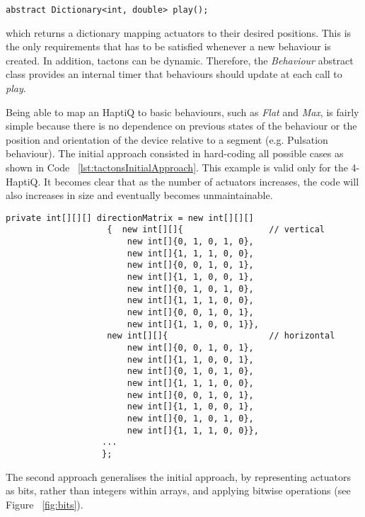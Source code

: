 \lstset{style=sharpc1}
\begin{lstlisting}
abstract Dictionary<int, double> play();
\end{lstlisting}

which returns a dictionary mapping actuators to their desired positions. 
This is the only requirements that has to be satisfied whenever a new behaviour is created. In addition, tactons can be dynamic. Therefore, the \textit{Behaviour} abstract class provides an internal timer that behaviours should update at each call to \textit{play}. 

Being able to map an HaptiQ to basic behaviours, such as \textit{Flat} and \textit{Max}, is fairly simple because there is no dependence on previous states of the behaviour or the position and orientation of the device relative to a segment (e.g. Pulsation behaviour). The initial approach consisted in hard-coding all possible cases as shown in Code ~\ref{lst:tactonsInitialApproach}. This example is valid only for the 4-HaptiQ. It becomes clear that as the number of actuators increases, the code will also increases in size and eventually becomes unmaintainable. 

\lstset{style=sharpc1}
\begin{lstlisting}[caption={Tactons - Initial approach},label={lst:tactonsInitialApproach}]
private int[][][] directionMatrix = new int[][][]
                    {  new int[][]{                 // vertical 
                        new int[]{0, 1, 0, 1, 0}, 
                        new int[]{1, 1, 1, 0, 0}, 
                        new int[]{0, 0, 1, 0, 1}, 
                        new int[]{1, 1, 0, 0, 1}, 
                        new int[]{0, 1, 0, 1, 0}, 
                        new int[]{1, 1, 1, 0, 0}, 
                        new int[]{0, 0, 1, 0, 1}, 
                        new int[]{1, 1, 0, 0, 1}}, 
                    new int[][]{                    // horizontal
                        new int[]{0, 0, 1, 0, 1},
                        new int[]{1, 1, 0, 0, 1},
                        new int[]{0, 1, 0, 1, 0},
                        new int[]{1, 1, 1, 0, 0},
                        new int[]{0, 0, 1, 0, 1},
                        new int[]{1, 1, 0, 0, 1},
                        new int[]{0, 1, 0, 1, 0},
                        new int[]{1, 1, 1, 0, 0}},
                   ...
                   };
\end{lstlisting}

The second approach generalises the initial approach, by representing actuators as bits, rather than integers within arrays, and applying bitwise operations (see Figure ~\ref{fig:bits}). 

